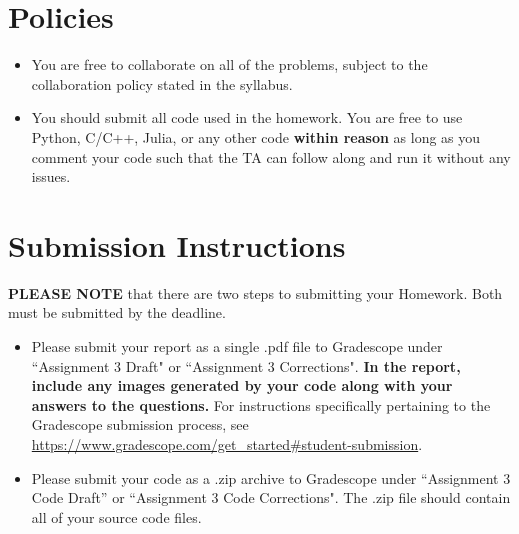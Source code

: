 \newif\ifshowsolutions
\showsolutionsfalse




\pagestyle{fancy}

\section*{Policies}
\begin{itemize}
  \item You are free to collaborate on all of the problems, subject to the collaboration policy stated in the syllabus.
  \item You should submit all code used in the homework.
        You are free to use Python, C/C++, Julia, or any other code \textbf{within reason} as long as you comment your code such that the TA can follow along and run it without any issues.
\end{itemize}

\section*{Submission Instructions}
\textbf{PLEASE NOTE} that there are two steps to submitting your Homework.
Both must be submitted by the deadline.

\begin{itemize}
  \item Please submit your report as a single .pdf file to Gradescope under ``Assignment 3 Draft" or ``Assignment 3 Corrections".
        \textbf{In the report, include any images generated by your code along with your answers to the questions.}
        For instructions specifically pertaining to the Gradescope submission process, see \url{https://www.gradescope.com/get_started#student-submission}.
  \item Please submit your code as a .zip archive to Gradescope under ``Assignment 3 Code Draft'' or ``Assignment 3 Code Corrections".
        The .zip file should contain all of your source code files.
\end{itemize}

